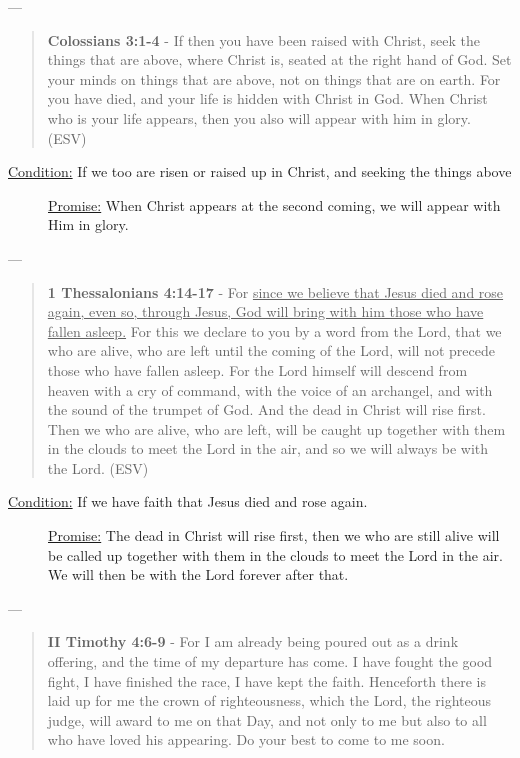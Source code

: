\documentclass[11pt]{article}
\begin{document}
---

\begin{quote}
\textbf{Colossians 3:1-4} - If then you have been raised with Christ, seek the things that are above, where Christ is, seated at the right hand of God. Set your minds on things that are above, not on things that are on earth. For you have died, and your life is hidden with Christ in God. When Christ who is your life appears, then you also will appear with him in glory. (ESV)
\end{quote}

\begin{description}
\item[{\uline{Condition:} If we too are risen or raised up in Christ, and seeking the things above}] \uline{Promise:} When Christ appears at the second coming, we will appear with Him in glory.
\end{description}

---

\begin{quote}
\textbf{1 Thessalonians 4:14-17} - For \uline{since we believe that Jesus died and rose again, even so, through Jesus, God will bring with him those who have fallen asleep.} For this we declare to you by a word from the Lord, that we who are alive, who are left until the coming of the Lord, will not precede those who have fallen asleep. For the Lord himself will descend from heaven with a cry of command, with the voice of an archangel, and with the sound of the trumpet of God. And the dead in Christ will rise first. Then we who are alive, who are left, will be caught up together with them in the clouds to meet the Lord in the air, and so we will always be with the Lord. (ESV)
\end{quote}

\begin{description}
\item[{\uline{Condition:} If we have faith that Jesus died and rose again.}] \uline{Promise:} The dead in Christ will rise first, then we who are still alive will be called up together with them in the clouds to meet the Lord in the air. We will then be with the Lord forever after that.
\end{description}

---

\begin{quote}
\textbf{II Timothy 4:6-9} - For I am already being poured out as a drink offering, and the time of my departure has come. I have fought the good fight, I have finished the race, I have kept the faith. Henceforth there is laid up for me the crown of righteousness, which the Lord, the righteous judge, will award to me on that Day, and not only to me but also to all who have loved his appearing. Do your best to come to me soon.
\end{quote}
\end{document}

